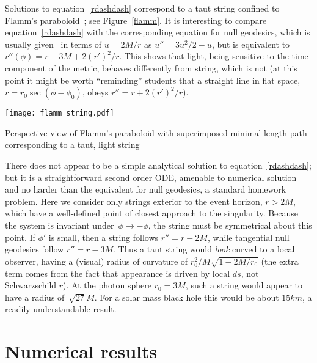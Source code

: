 \documentclass{ws-tpe}
\begin{document}
\noindent Solutions to equation~\ref{rdashdash} correspond to a taut
string confined to Flamm's paraboloid~\cite{flamm1916}; see
Figure~\ref{flamm}.  It is interesting to compare
equation~\ref{rdashdash} with the corresponding equation for null
geodesics, which is usually given~\cite{wald} in terms of $u=2M/r$ as
$u''=3u^2/2-u$, but is equivalent
to~$r''\left(\phi\right)=r-3M+2\left(r'\right)^2/r$.  This shows that
light, being sensitive to the time component of the metric, behaves
differently from string, which is not (at this point it might be worth
``reminding'' students that a straight line in flat space,
$r=r_0\sec\left(\phi-\phi_0\right)$, obeys
$r''=r+2\left(r'\right)^2/r$).

\begin{figurehere} %
\centering
\texttt{[image: flamm\_string.pdf]}
\caption{Perspective view of Flamm's paraboloid with superimposed minimal-length
  path corresponding to a taut, light string}
\label{flamm}
\end{figurehere}

There does not appear to be a simple analytical solution to
equation~\ref{rdashdash}; but it is a straightforward second order
ODE, amenable to numerical solution and no harder than the equivalent
for null geodesics, a standard homework problem.  Here we consider
only strings exterior to the event horizon, $r>2M$, which have a
well-defined point of closest approach to the singularity.  Because
the system is invariant under~$\phi\longrightarrow-\phi$, the string
must be symmetrical about this point.  If $\phi'$ is small, then a
string follows $r''=r-2M$, while tangential null geodesics follow
$r''=r-3M$.  Thus a taut string would {\em look} curved to a local
observer, having a (visual) radius of curvature of
$r_0^2/M\sqrt{1-2M/r_0}$ (the extra term comes from the fact that
appearance is driven by local $ds$, not Schwarzschild $r$).  At the
photon sphere $r_0=3M$, such a string would appear to have a radius
of~$\sqrt{27}M$.  For a solar mass black hole this would be about
$15\unit{km}$, a readily understandable result.


\section{Numerical results}
\end{document}
